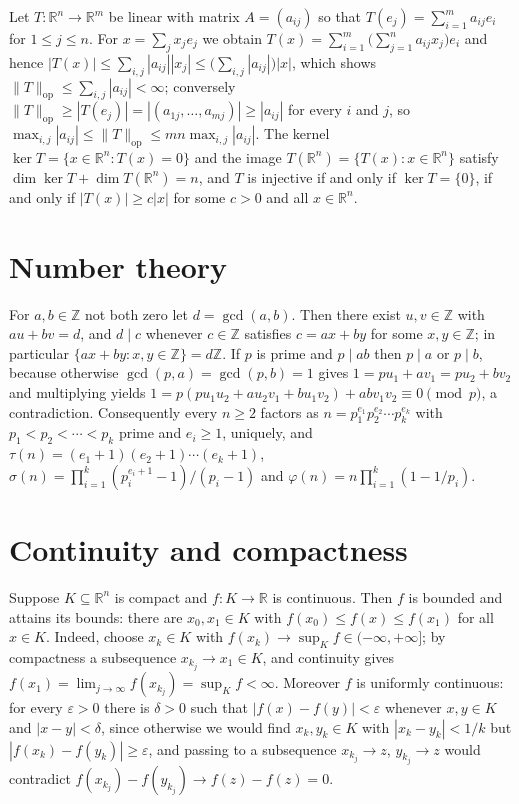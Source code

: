 \documentclass[11pt]{article}
\newcommand{\Z}{\mathbb{Z}}
\newcommand{\R}{\mathbb{R}}
\begin{document}
Let $T : \R^n \to \R^m$ be linear with matrix $A = (a_{ij})$ so that $T(e_j) = \sum_{i=1}^{m} a_{ij} e_i$ for $1 \le j \le n$. For $x = \sum_{j} x_j e_j$ we obtain $T(x) = \sum_{i=1}^{m} \bigl( \sum_{j=1}^{n} a_{ij} x_j \bigr) e_i$ and hence $|T(x)| \le \sum_{i,j} |a_{ij}| |x_j| \le \bigl( \sum_{i,j} |a_{ij}| \bigr) |x|$, which shows $\|T\|_{\mathrm{op}} \le \sum_{i,j} |a_{ij}| < \infty$; conversely $\|T\|_{\mathrm{op}} \ge |T(e_j)| = |(a_{1j}, \dots, a_{mj})| \ge |a_{ij}|$ for every $i$ and $j$, so $\max_{i,j} |a_{ij}| \le \|T\|_{\mathrm{op}} \le mn \max_{i,j} |a_{ij}|$. The kernel $\ker T = \{x \in \R^n : T(x) = 0\}$ and the image $T(\R^n) = \{T(x) : x \in \R^n\}$ satisfy $\dim \ker T + \dim T(\R^n) = n$, and $T$ is injective if and only if $\ker T = \{0\}$, if and only if $|T(x)| \ge c|x|$ for some $c > 0$ and all $x \in \R^n$.

\section*{Number theory}

For $a, b \in \Z$ not both zero let $d = \gcd(a, b)$. Then there exist $u, v \in \Z$ with $au + bv = d$, and $d \mid c$ whenever $c \in \Z$ satisfies $c = ax + by$ for some $x, y \in \Z$; in particular $\{ax + by : x, y \in \Z\} = d\Z$. If $p$ is prime and $p \mid ab$ then $p \mid a$ or $p \mid b$, because otherwise $\gcd(p, a) = \gcd(p, b) = 1$ gives $1 = pu_1 + av_1 = pu_2 + bv_2$ and multiplying yields $1 = p(pu_1u_2 + au_2v_1 + bu_1v_2) + ab v_1 v_2 \equiv 0 \pmod p$, a contradiction. Consequently every $n \ge 2$ factors as $n = p_1^{e_1} p_2^{e_2} \cdots p_k^{e_k}$ with $p_1 < p_2 < \cdots < p_k$ prime and $e_i \ge 1$, uniquely, and $\tau(n) = (e_1 + 1)(e_2 + 1) \cdots (e_k + 1)$, $\sigma(n) = \prod_{i=1}^{k} (p_i^{e_i+1} - 1)/(p_i - 1)$ and $\varphi(n) = n \prod_{i=1}^{k} (1 - 1/p_i)$.

\section*{Continuity and compactness}

Suppose $K \subseteq \R^n$ is compact and $f : K \to \R$ is continuous. Then $f$ is bounded and attains its bounds: there are $x_0, x_1 \in K$ with $f(x_0) \le f(x) \le f(x_1)$ for all $x \in K$. Indeed, choose $x_k \in K$ with $f(x_k) \to \sup_K f \in (-\infty, +\infty]$; by compactness a subsequence $x_{k_j} \to x_1 \in K$, and continuity gives $f(x_1) = \lim_{j \to \infty} f(x_{k_j}) = \sup_K f < \infty$. Moreover $f$ is uniformly continuous: for every $\varepsilon > 0$ there is $\delta > 0$ such that $|f(x) - f(y)| < \varepsilon$ whenever $x, y \in K$ and $|x - y| < \delta$, since otherwise we would find $x_k, y_k \in K$ with $|x_k - y_k| < 1/k$ but $|f(x_k) - f(y_k)| \ge \varepsilon$, and passing to a subsequence $x_{k_j} \to z$, $y_{k_j} \to z$ would contradict $f(x_{k_j}) - f(y_{k_j}) \to f(z) - f(z) = 0$.
\end{document}
